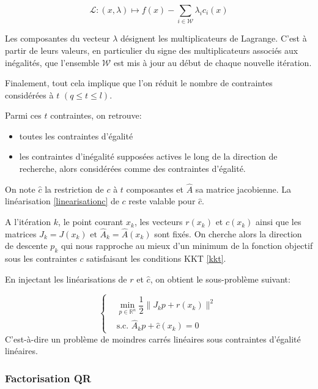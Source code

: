 \documentclass[a4paper,11pt]{article}
\newcommand{\real}{\mathbb{R}}
\newcommand{\ha}{\hat{A}}
\newcommand{\hc}{\hat{c}}
\numberwithin{equation}{section}
\begin{document}
\begin{equation} \label{lagrangien}
\mathcal{L}:(x,\lambda) \mapsto f(x) - \sum\limits_{i\in \mathcal{W}} \lambda_{i}c_{i}(x)
\end{equation}

Les composantes du vecteur $\lambda$ désignent les multiplicateurs de Lagrange. C'est à partir de leurs valeurs, en particulier du signe des multiplicateurs associés aux inégalités, que l'ensemble $\mathcal{W}$ est mis à jour au début de chaque nouvelle itération.

Finalement, tout cela implique que l'on réduit le nombre de contraintes considérées à $t$ $(q \leq t \leq l)$. 

Parmi ces $t$ contraintes, on retrouve:
\begin{itemize}
\item
toutes les contraintes d'égalité
\item
les contraintes d'inégalité supposées actives le long de la direction de recherche, alors considérées comme des contraintes d'égalité. 
\end{itemize}

On note $\hc$ la restriction de $c$ à $t$ composantes et $\ha$ sa matrice jacobienne. La linéarisation \ref{linearisationc} de $c$ reste valable pour $\hc$.

A l'itération $k$,  le point courant $x_{k}$, les vecteurs $r(x_{k})$ et $\hc(x_{k})$ ainsi que les matrices $J_{k}=J(x_{k}) \text{ et } \ha_{k}=\ha(x_{k})$ sont fixés. On cherche alors la direction de descente $p_{k}$ qui nous rapproche au mieux d'un minimum  de la fonction objectif sous les contraintes $c$ satisfaisant les conditions KKT \eqref{kkt}. 

En injectant les linéarisations de $r$ et $\hc$, on obtient le sous-problème suivant:

\begin{equation} \label{souspb}
\left\{ \begin{aligned}
&\underset{p \in \real^{n}}{\min} \dfrac{1}{2}\|J_{k}p+r(x_{k})\|^{2} \\
&\text{s.c. }  \ha_{k}p+\hc(x_{k})=0
\end{aligned} \right.
\end{equation}
C'est-à-dire un problème de moindres carrés linéaires sous contraintes d'égalité linéaires.

\subsubsection{Factorisation QR} \label{factqr}
\end{document}
